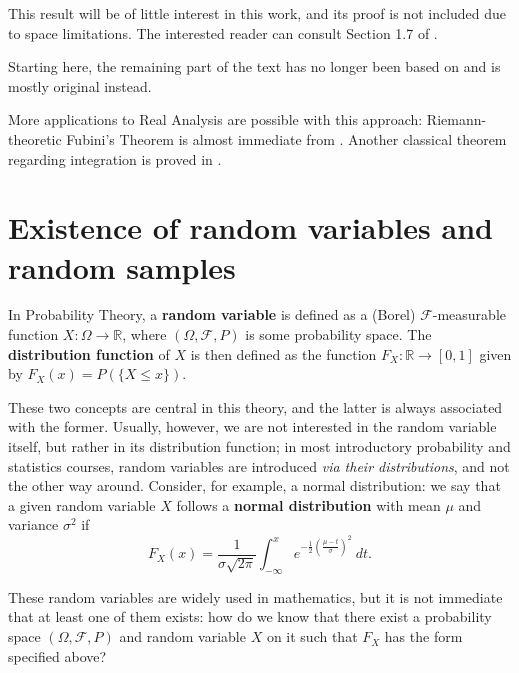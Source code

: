 This result will be of little interest in this work, and its proof is not
included due to space limitations. The interested reader can consult Section 1.7 of \cite{ash1972real}.

Starting here, the remaining part of the text has no longer been based on \cite{ash1972real} and is mostly original instead.

More applications to Real Analysis are possible with this approach: Riemann-theoretic Fubini's Theorem is almost immediate from . Another classical theorem regarding integration is proved in .


\section{Existence of random variables and random samples}

In Probability Theory, a \textbf{random variable} is defined as a (Borel) \(\mathcal{F}\)-measurable function \(X\colon\Omega\to\mathbb{R}\), where \(\left(\Omega,\mathcal{F},P\right)\) is some probability space.
The \textbf{distribution function} of \(X\) is then defined as the function \(F_X\colon \mathbb{R}\to [0,1] \) given by \(F_X(x)=P(\{X\leq x\})\).

These two concepts are central in this theory, and the latter is always associated with the former. Usually, however, we are not interested in the random variable itself, but rather in its distribution function; in most introductory probability and statistics courses, random variables are introduced \emph{via their distributions}, and not the other way around.
Consider, for example, a normal distribution: we say that a given random variable \(X\) follows a \textbf{normal distribution} with mean \(\mu\) and variance \(\sigma^2\) if
\[
		F_X(x)=\frac{1}{\sigma\sqrt{2\pi}}\int_{-\infty}^x e^{-\frac{1}{2}\left(\frac{\mu-t}{\sigma}\right)^2}~dt
.\]

These random variables are widely used in mathematics, but it is not immediate that at least one of them exists: how do we know that there exist a probability space \(\left(\Omega,\mathcal{F},P\right)\) and random variable \(X\) on it such that \(F_X\) has the form specified above?

